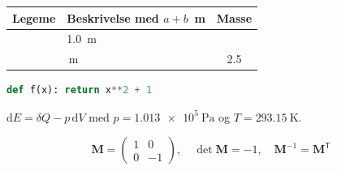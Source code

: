 \documentclass{article}
\begin{document}
\begin{tabularx}{\linewidth}{@{}>{\bfseries}l X<{\,m} S[table-format=2.1]@{}} \toprule
  Legeme & Beskrivelse med $a + b$ & {Masse} \\ \midrule
   & 1.0 \\ \cmidrule(lr){1-2} & & 2.5 \\ \bottomrule
\end{tabularx}
\begin{lstlisting}[language=Python, caption={Kode med x += 1}, label=lst:kode]
def f(x): return x**2 + 1
\end{lstlisting}
\begin{tcolorbox}[colback=rust!5, colframe=rust, title=Merk, breakable]
  $\mathrm{d}E = \delta Q - p\,\mathrm{d}V$ med $p = \SI{1.013e5}{\pascal}$ og $T = \qty{293.15}{\kelvin}$.
\end{tcolorbox}
\begin{equation*}
  \mathbf{M} = \begin{pmatrix} 1 & 0 \\ 0 & -1 \end{pmatrix}, \quad \det\mathbf{M} = -1, \quad \mathbf{M}^{-1} = \mathbf{M}^{\mathsf{T}}
\end{equation*}
\end{document}
